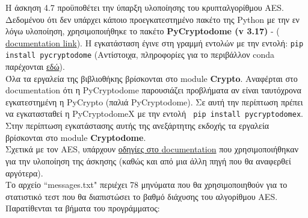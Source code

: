 \documentclass[12pt]{article}
\newcommand{\lt}{\latintext}
\begin{document}
Η άσκηση 4.7 προϋποθέτει την ύπαρξη υλοποίησης του 
κρυπταλγορίθμου {\lt AES}. Δεδομένου ότι δεν υπάρχει κάποιο 
προεγκατεστημένο πακέτο της {\lt Python} με την εν λόγω 
υλοποίηση, χρησιμοποιήθηκε το πακέτο \textbf{\lt 
PyCryptodome (v 3.17)} - 
(\href{https://pycryptodome.readthedocs.io/en/latest/}
{\lt \color{blue} documentation link}). 
Η εγκατάσταση έγινε στη γραμμή εντολών με την εντολή: 
\texttt{\lt pip install pycryptodome} (Αντίστοιχα, 
πληροφορίες για το περιβάλλον {\lt conda} 
παρέχονται \href{https://anaconda.org/conda-forge/pycryptodome}
{\color{blue} εδώ}). \\
\indent
Όλα τα εργαλεία της βιβλιοθήκης βρίσκονται στο {\lt module 
\textbf{Crypto}}. Αναφέρται στο {\lt documentation} ότι η 
{\lt PyCryptodome} παρουσιάζει προβλήματα αν είναι ταυτόχρονα 
εγκατεστημένη η {\lt PyCrypto} (παλιά {\lt PyCryptodome}). 
Σε αυτή την περίπτωση πρέπει να εγκατασταθεί η 
{\lt PyCryptodomeX} με την εντολή \texttt{\lt 
pip install pycryptodomex}. Στην περίπτωση εγκατάστασης αυτής 
της ανεξάρτητης εκδοχής τα εργαλεία βρίσκονται στο 
{\lt module \textbf{Cryptodome}}. \\
\indent
Σχετικά με τον {\lt AES}, υπάρχουν 
\href{https://pycryptodome.readthedocs.io/en/latest/src/cipher/aes.html}{\color{blue}οδηγίες στο {\lt documentation}} που 
χρησιμοποιήθηκαν για την υλοποίηση της άσκησης (καθώς και από 
μια άλλη πηγή που θα αναφερθεί αργότερα). \\
\indent
Το αρχείο {\lt ``messages.txt"} περιέχει 78 μηνύματα που θα 
χρησιμοποιηθούν για το στατιστικό τεστ που θα διαπιστώσει το 
βαθμό διάχυσης του αλγορίθμου {\lt AES}.
Παρατίθενται τα βήματα του προγράμματος:
\end{document}
